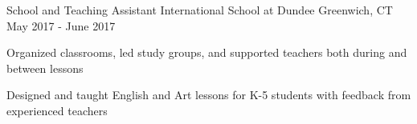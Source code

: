 \begin{cventries}
  \cventry
  {School and Teaching Assistant}
  {International School at Dundee}
  {Greenwich, CT}
  {May 2017 - June 2017}
  {
    \begin{cvitems}
      \item{Organized classrooms, led study groups, and supported teachers both during and between lessons}
      \item{Designed and taught English and Art lessons for K-5 students with feedback from experienced teachers}
    \end{cvitems}
  }
\end{cventries}

